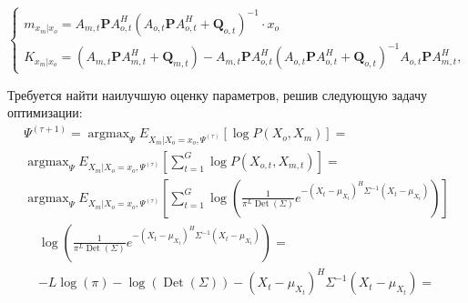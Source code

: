 \documentclass[11pt]{article}
\DeclareMathOperator*{\argmax}{argmax}
\DeclareMathOperator{\Det}{Det}
\begin{document}
\begin{equation}
\left\{ \begin{gathered} 
m_{x_m|x_o} = A_{m,t}\mathbf{P} A_{o,t}^H(A_{o,t}\mathbf{P} A_{o,t}^H + \mathbf{Q}_{o,t})^{-1}\cdot x_o\\
K_{x_m|x_o} = (A_{m,t}\mathbf{P} A_{m,t}^H + \mathbf{Q}_{m,t})-A_{m,t}\mathbf{P} A_{o,t}^H (A_{o,t}\mathbf{P} A_{o,t}^H + \mathbf{Q}_{o,t})^{-1}A_{o,t}\mathbf{P} A_{m,t}^H,
\end{gathered} \right.
\end{equation}
\begin{center}
\fontsize{16}{20}\selectfont {}
\end{center}
Требуется найти наилучшую оценку параметров, решив следующую задачу оптимизации:
\begin{equation}
\begin{gathered}
\Psi^{(\tau+1)}=\argmax_{\Psi} E_{X_m|X_o=x_o, \Psi^{(\tau)}}[\log P(X_o, X_m)] =\\
\argmax_{\Psi}  E_{X_m|X_o=x_o, \Psi^{(\tau)}}\left[\sum_{t=1}^G\log P(X_{o,t}, X_{m,t})\right] = \\
\argmax_{\Psi}  E_{X_m|X_o=x_o, \Psi^{(\tau)}}\left[\sum_{t=1}^G \log \left(\frac{1}{\pi^{L}\Det(\Sigma)}e^{-(X_t-\mu_{X_t})^H\Sigma^{-1}(X_t-\mu_{X_t})}\right)\right]
\end{gathered}
\end{equation}
\begin{equation}
\begin{gathered}
 \log \left(\frac{1}{\pi^{L}\Det(\Sigma)}e^{-(X_t-\mu_{X_t})^H\Sigma^{-1}(X_t-\mu_{X_t})}\right) = \\
-L\log(\pi) - \log(\Det(\Sigma)) -(X_t-\mu_{X_t})^H\Sigma^{-1}(X_t-\mu_{X_t})= \\
\end{gathered}
\end{equation}
\end{document}
